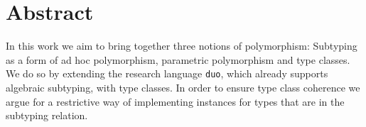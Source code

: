 \documentclass[twoside,12pt,a4paper]{report}
\begin{document}

\setcounter{page}{1}



\section*{Abstract}

In this work we aim to bring together three notions of polymorphism:
Subtyping as a form of ad hoc polymorphism, parametric polymorphism and type classes.
We do so by extending the research language \texttt{duo}, which already supports algebraic subtyping, with type classes.
In order to ensure type class coherence we argue for a restrictive way of implementing instances for types that are in the subtyping relation.



\cleardoublepage


\renewcommand{\baselinestretch}{1.3}
\small\normalsize

\tableofcontents

\renewcommand{\baselinestretch}{1}
\small\normalsize

\cleardoublepage


\setcounter{page}{1}


\cleardoublepage


\cleardoublepage
\end{document}
